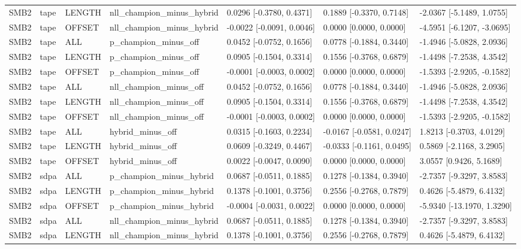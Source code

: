 \begin{tabular}{lllllll}
SMB2 & tape & LENGTH & nll\_champion\_minus\_hybrid & 0.0296 [-0.3780, 0.4371] & 0.1889 [-0.3370, 0.7148] & -2.0367 [-5.1489, 1.0755] \\
SMB2 & tape & OFFSET & nll\_champion\_minus\_hybrid & -0.0022 [-0.0091, 0.0046] & 0.0000 [0.0000, 0.0000] & -4.5951 [-6.1207, -3.0695] \\
SMB2 & tape & ALL & p\_champion\_minus\_off & 0.0452 [-0.0752, 0.1656] & 0.0778 [-0.1884, 0.3440] & -1.4946 [-5.0828, 2.0936] \\
SMB2 & tape & LENGTH & p\_champion\_minus\_off & 0.0905 [-0.1504, 0.3314] & 0.1556 [-0.3768, 0.6879] & -1.4498 [-7.2538, 4.3542] \\
SMB2 & tape & OFFSET & p\_champion\_minus\_off & -0.0001 [-0.0003, 0.0002] & 0.0000 [0.0000, 0.0000] & -1.5393 [-2.9205, -0.1582] \\
SMB2 & tape & ALL & nll\_champion\_minus\_off & 0.0452 [-0.0752, 0.1656] & 0.0778 [-0.1884, 0.3440] & -1.4946 [-5.0828, 2.0936] \\
SMB2 & tape & LENGTH & nll\_champion\_minus\_off & 0.0905 [-0.1504, 0.3314] & 0.1556 [-0.3768, 0.6879] & -1.4498 [-7.2538, 4.3542] \\
SMB2 & tape & OFFSET & nll\_champion\_minus\_off & -0.0001 [-0.0003, 0.0002] & 0.0000 [0.0000, 0.0000] & -1.5393 [-2.9205, -0.1582] \\
SMB2 & tape & ALL & hybrid\_minus\_off & 0.0315 [-0.1603, 0.2234] & -0.0167 [-0.0581, 0.0247] & 1.8213 [-0.3703, 4.0129] \\
SMB2 & tape & LENGTH & hybrid\_minus\_off & 0.0609 [-0.3249, 0.4467] & -0.0333 [-0.1161, 0.0495] & 0.5869 [-2.1168, 3.2905] \\
SMB2 & tape & OFFSET & hybrid\_minus\_off & 0.0022 [-0.0047, 0.0090] & 0.0000 [0.0000, 0.0000] & 3.0557 [0.9426, 5.1689] \\
SMB2 & sdpa & ALL & p\_champion\_minus\_hybrid & 0.0687 [-0.0511, 0.1885] & 0.1278 [-0.1384, 0.3940] & -2.7357 [-9.3297, 3.8583] \\
SMB2 & sdpa & LENGTH & p\_champion\_minus\_hybrid & 0.1378 [-0.1001, 0.3756] & 0.2556 [-0.2768, 0.7879] & 0.4626 [-5.4879, 6.4132] \\
SMB2 & sdpa & OFFSET & p\_champion\_minus\_hybrid & -0.0004 [-0.0031, 0.0022] & 0.0000 [0.0000, 0.0000] & -5.9340 [-13.1970, 1.3290] \\
SMB2 & sdpa & ALL & nll\_champion\_minus\_hybrid & 0.0687 [-0.0511, 0.1885] & 0.1278 [-0.1384, 0.3940] & -2.7357 [-9.3297, 3.8583] \\
SMB2 & sdpa & LENGTH & nll\_champion\_minus\_hybrid & 0.1378 [-0.1001, 0.3756] & 0.2556 [-0.2768, 0.7879] & 0.4626 [-5.4879, 6.4132] \\

\end{tabular}
